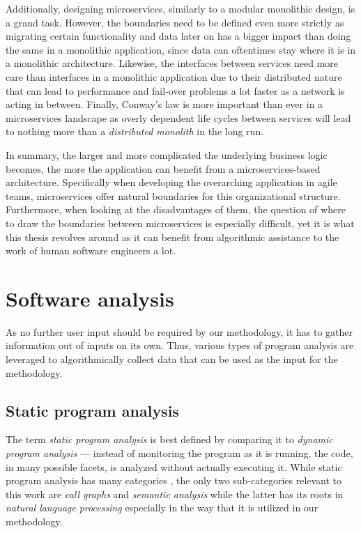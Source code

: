 \documentclass[12pt,a4paper]{report}
\begin{document}
Additionally, designing microservices, similarly to a modular monolithic design,
is a grand task. However, the boundaries need to be defined even more strictly
as migrating certain functionality and data later on has a bigger impact than
doing the same in a monolithic application, since data can oftentimes
stay where it is in a monolithic architecture.
Likewise, the interfaces between services need more care than interfaces in a
monolithic application due to their distributed nature that can lead to
performance and fail-over problems a lot faster as a network is acting
in between.
Finally, Conway's law \cite{conway1968law} is more important than ever
in a microservices landscape as overly dependent life cycles between services
will lead to nothing more than a \textit{distributed monolith} in the long run.
\newline


In summary, the larger and more complicated the underlying business logic
becomes, the more the application can benefit from a microservices\hyp based architecture.
Specifically when developing the overarching application in agile teams,
microservices offer natural boundaries for this organizational structure.
Furthermore, when looking at the disadvantages of them, the question of where
to draw the boundaries between microservices is especially difficult,
yet it is what this thesis revolves around as it can benefit from
algorithmic assistance to the work of human software engineers a lot.



\section{Software analysis} \label{sect:background-program-analysis}

As no further user input should be required by our methodology,
it has to gather information out of inputs on its own.
Thus, various types of program analysis are leveraged to
algorithmically collect data that can be used as the input for the methodology.


\subsection{Static program analysis}

The term \textit{static program analysis} is best defined by comparing it
to \textit{dynamic program analysis} --- instead of monitoring the program
as it is running, the code, in many possible facets, is analyzed without
actually executing it. While static program analysis has many categories
\cite{woegerer2005static}, the only two sub-categories relevant to this work
are \textit{call graphs} and \textit{semantic analysis} while the
latter has its roots in \textit{natural language processing} especially in
the way that it is utilized in our methodology.
\end{document}

